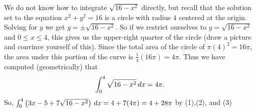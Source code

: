 \documentclass[nooutcomes,handout]{ximera}
\begin{document}
\begin{problem}
\begin{enumerate}
\begin{freeResponse}
      We do not know how to integrate $\sqrt{16-x^2}$ directly, but recall that the solution set to the equation $x^2 + y^2 = 16$ is a circle with radius $4$ centered at the origin.  
      Solving for $y$ we get $y = \pm \sqrt{16-x^2}$.  
      So if we restrict ourselves to $y=\sqrt{16-x^2}$ and $0 \leq x \leq 4$, this gives us the upper-right quarter of the circle (draw a picture and convince yourself of this).  
      Since the total area of the circle of $\pi (4)^2 = 16\pi$, the area under this portion of the curve is $\frac{1}{4} (16\pi) = 4\pi$.  
      Thus we have computed (geometrically) that 
      \begin{equation}\label{eq3}
        \int_0^4 \sqrt{16-x^2} \,d x = 4\pi. 
      \end{equation}
      So, $\int _0^4 \left( 3x - 5 + 7 \sqrt{16-x^2} \right) \,d x = 4 + 7(4\pi) = 4 + 28\pi$ by (1),(2), and (3)
      \end{freeResponse}
  \end{enumerate}
\end{problem}
\end{document}

